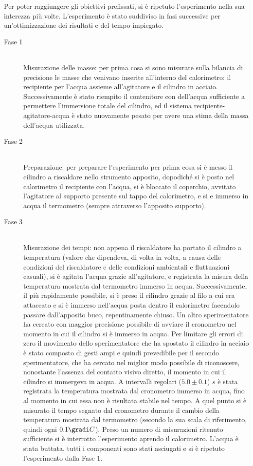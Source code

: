 Per poter raggiungere gli obiettivi prefissati, si è ripetuto l’esperimento nella sua interezza più volte. L’esperimento è stato suddiviso 
in fasi successive per un’ottimizzazione dei risultati e del tempo impiegato.
\begin{description}

  \item[Fase 1] \hfill \\
	  Misurazione delle masse: per prima cosa si sono misurate sulla bilancia di precisione le masse che venivano inserite all’interno 
	  del calorimetro: il recipiente per l’acqua assieme all’agitatore e il cilindro in acciaio. Successivamente è stato riempito il 
	  contenitore con dell’acqua sufficiente a permettere l’immersione totale del cilindro, ed il sistema recipiente-agitatore-acqua è 
	  stato nuovamente pesato per avere una stima della massa dell’acqua utilizzata.
  \item[Fase 2] \hfill \\
	  Preparazione: per preparare l’esperimento per prima cosa si è messo il cilindro a riscaldare nello strumento apposito, dopodiché 
	  si è posto nel calorimetro il recipiente con l’acqua, si è bloccato il coperchio, avvitato l’agitatore al supporto presente sul 
	  tappo del calorimetro, e si e immerso in acqua il termometro (sempre attraverso l’apposito supporto).
  \item[Fase 3] \hfill \\
	Misurazione dei tempi: non appena il riscaldatore ha portato il cilindro a 
	temperatura (valore che dipendeva, di volta in volta, a causa delle condizioni del riscaldatore e delle condizioni ambientali e fluttuazioni casuali), 
	si è agitata l’acqua grazie all’agitatore, e registrata la misura della temperatura mostrata dal termometro immerso in acqua. 
	Successivamente, il più rapidamente possibile, si è preso il cilindro grazie al filo a cui era attaccato e si è immerso nell’acqua
	posta dentro il calorimetro facendolo passare dall’apposito buco, repentinamente chiuso. Un altro sperimentatore ha cercato con 
	maggior precisione possibile di avviare il cronometro nel momento in cui il cilindro si è immerso in acqua. Per limitare gli errori
	di zero il movimento dello sperimentatore che ha spostato il cilindro in acciaio è stato composto di gesti ampi e quindi 
	prevedibile per il secondo sperimentatore, che ha cercato nel miglior modo possibile di riconoscere, nonostante l’assenza del 
	contatto visivo diretto, il momento in cui il cilindro si immergeva in acqua. A intervalli regolari ($5.0 \pm 0.1 $) $s$ è stata 
	registrata la temperatura mostrata dal cronometro immerso in acqua, fino al momento in cui essa non è risultata stabile nel tempo.
	A quel punto si è misurato il tempo segnato dal cronometro durante il cambio della temperatura mostrata dal termometro (secondo la 
	sua scala di riferimento, quindi ogni $0.1 \gradi C$). Preso un numero di misurazioni ritenuto sufficiente si è interrotto l’esperimento 
	aprendo il calorimetro. L’acqua è stata buttata, tutti i componenti sono stati asciugati e si è ripetuto l’esperimento dalla Fase 
	1.
\end{description}

